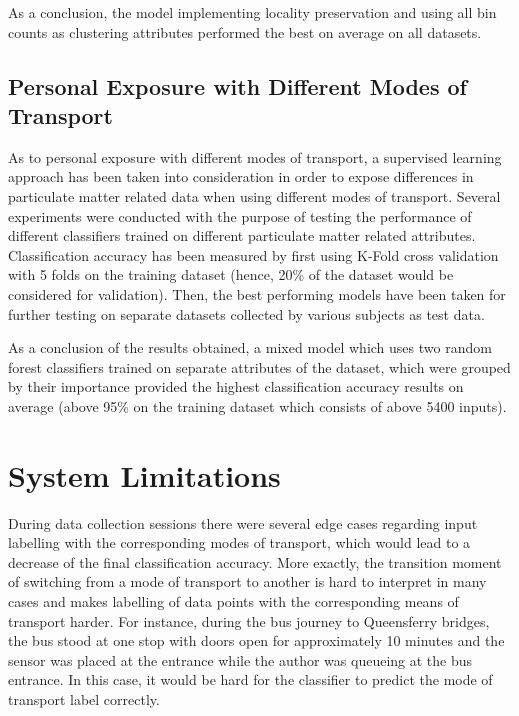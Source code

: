 \documentclass[bsc,frontabs,twoside,singlespacing, parskip,deptreport]{infthesis}     %
\begin{document}
As a conclusion, the model implementing locality preservation and using all bin counts as clustering attributes performed the best on average on all datasets.

\subsection{Personal Exposure with Different Modes of Transport}

As to personal exposure with different modes of transport, a supervised learning approach has been taken into consideration in order to expose differences in particulate matter related data when using different modes of transport. Several experiments were conducted with the purpose of testing the performance of different classifiers trained on different particulate matter related attributes. Classification accuracy has been measured by first using K-Fold cross validation with 5 folds on the training dataset (hence, 20\% of the dataset would be considered for validation). Then, the best performing models have been taken for further testing on separate datasets collected by various subjects as test data. 

As a conclusion of the results obtained, a mixed model which uses two random forest classifiers trained on separate attributes of the dataset, which were grouped by their importance provided the highest classification accuracy results on average (above 95\% on the training dataset which consists of above 5400 inputs).


\section{System Limitations}
\label{sec:limitations}

During data collection sessions there were several edge cases regarding input labelling with the corresponding modes of transport, which would lead to a decrease of the final classification accuracy. More exactly, the transition moment of switching from a mode of transport to another is hard to interpret in many cases and makes labelling of data points with the corresponding means of transport harder. For instance, during the bus journey to Queensferry bridges, the bus stood at one stop with doors open for approximately 10 minutes and the sensor was placed at the entrance while the author was queueing at the bus entrance. In this case, it would be hard for the classifier to predict the mode of transport label correctly. 
\end{document}
